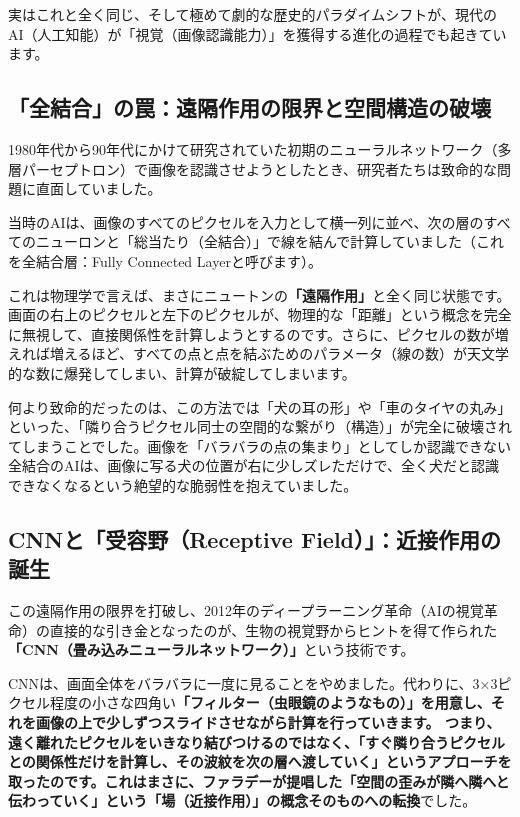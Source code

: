 実はこれと全く同じ、そして極めて劇的な歴史的パラダイムシフトが、現代のAI（人工知能）が「視覚（画像認識能力）」を獲得する進化の過程でも起きています。

\subsection{「全結合」の罠：遠隔作用の限界と空間構造の破壊}

1980年代から90年代にかけて研究されていた初期のニューラルネットワーク（多層パーセプトロン）で画像を認識させようとしたとき、研究者たちは致命的な問題に直面していました。

当時のAIは、画像のすべてのピクセルを入力として横一列に並べ、次の層のすべてのニューロンと「総当たり（全結合）」で線を結んで計算していました（これを全結合層：Fully Connected Layerと呼びます）。

これは物理学で言えば、まさにニュートンの\textbf{「遠隔作用」}と全く同じ状態です。画面の右上のピクセルと左下のピクセルが、物理的な「距離」という概念を完全に無視して、直接関係性を計算しようとするのです。さらに、ピクセルの数が増えれば増えるほど、すべての点と点を結ぶためのパラメータ（線の数）が天文学的な数に爆発してしまい、計算が破綻してしまいます。

何より致命的だったのは、この方法では「犬の耳の形」や「車のタイヤの丸み」といった、「隣り合うピクセル同士の空間的な繋がり（構造）」が完全に破壊されてしまうことでした。画像を「バラバラの点の集まり」としてしか認識できない全結合のAIは、画像に写る犬の位置が右に少しズレただけで、全く犬だと認識できなくなるという絶望的な脆弱性を抱えていました。

\subsection{CNNと「受容野（Receptive Field）」：近接作用の誕生}

この遠隔作用の限界を打破し、2012年のディープラーニング革命（AIの視覚革命）の直接的な引き金となったのが、生物の視覚野からヒントを得て作られた\textbf{「CNN（畳み込みニューラルネットワーク）」}という技術です。

CNNは、画面全体をバラバラに一度に見ることをやめました。代わりに、3×3ピクセル程度の小さな四角い\textbf{「フィルター（虫眼鏡のようなもの）」を用意し、それを画像の上で少しずつスライドさせながら計算を行っていきます。 つまり、遠く離れたピクセルをいきなり結びつけるのではなく、「すぐ隣り合うピクセルとの関係性だけを計算し、その波紋を次の層へ渡していく」というアプローチを取ったのです。これはまさに、ファラデーが提唱した「空間の歪みが隣へ隣へと伝わっていく」という「場（近接作用）」の概念そのものへの転換}でした。

